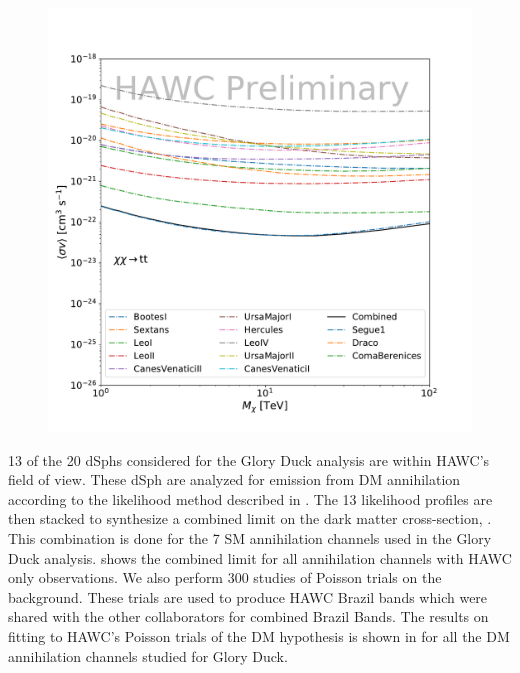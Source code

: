 \begin{figure}[ht]
{    \includegraphics[scale=0.215]{figures/glory_duck/hawc/Combined95_GD_tt.pdf}
    }
    \caption{}
 \label{fig:hawc_combined_limit}
\end{figure}

13 of the 20 dSphs considered for the Glory Duck analysis are within HAWC's field of view.
These dSph are analyzed for emission from DM annihilation according to the likelihood method described in .
The 13 likelihood profiles are then stacked to synthesize a combined limit on the dark matter cross-section, \sv.
This combination is done for the 7 SM annihilation channels used in the Glory Duck analysis.
 shows the combined limit for all annihilation channels with HAWC only observations.
We also perform 300 studies of Poisson trials on the background.
These trials are used to produce HAWC Brazil bands which were shared with the other collaborators for combined Brazil Bands.
The results on fitting to HAWC's Poisson trials of the DM hypothesis is shown in  for all the DM annihilation channels studied for Glory Duck.

